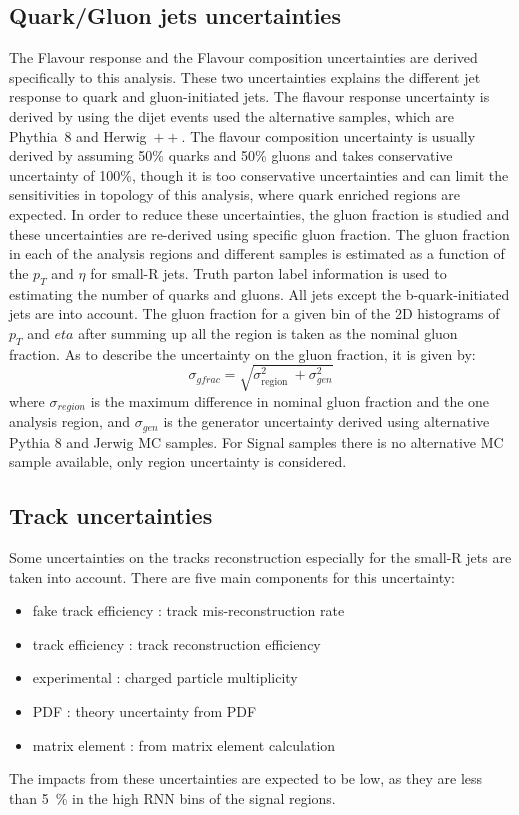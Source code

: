 \subsection{Quark/Gluon jets uncertainties}
The Flavour response and the Flavour composition uncertainties are derived specifically to this analysis.
These two uncertainties explains the different jet response to quark and gluon-initiated jets. The flavour response uncertainty is derived by using the dijet events used the alternative samples, which are Phythia~8 and Herwig~$\plus\plus$. The flavour composition uncertainty is usually derived by assuming 50\% quarks and 50\% gluons and takes conservative uncertainty of 100\%, though it is too conservative uncertainties and can limit the sensitivities in topology of this analysis, where quark enriched regions are
expected. In order to reduce these uncertainties, the gluon fraction is studied and these uncertainties are re-derived using specific gluon fraction.
The gluon fraction in each of the analysis regions and different samples is estimated as a function of the $p_T$ and $\eta$ for small-R jets. Truth parton label information is used to estimating the number of quarks and gluons. All jets except the b-quark-initiated jets are into account.
The gluon fraction for a given bin of the 2D histograms of $p_T$ and $eta$ after summing up all the region is taken as the nominal gluon fraction. As to describe the uncertainty on the gluon fraction, it is given by:
\begin{equation}
\sigma_{gfrac}=\sqrt{\sigma_{\text {region }}^{2}+\sigma_{g e n}^{2}}
\end{equation}
where $\sigma_{region}$ is the maximum difference in nominal gluon fraction and the one analysis region, and $\sigma_{gen}$ is the generator uncertainty derived using alternative Pythia 8 and Jerwig MC samples. For Signal samples there is no alternative MC sample available, only region uncertainty is considered.
\subsection{Track uncertainties}
Some uncertainties on the tracks reconstruction especially for the small-R jets are taken into account. There are five main components for this uncertainty: 
\begin{itemize}
    \item fake track efficiency : track mis-reconstruction rate  
    \item track efficiency : track reconstruction efficiency
    \item experimental : charged particle multiplicity 
    \item PDF : theory uncertainty from PDF
    \item matrix element : from matrix element calculation
\end{itemize}
The impacts from these uncertainties are expected to be low, as they are less than 5~\% in the high RNN bins of the signal regions.

